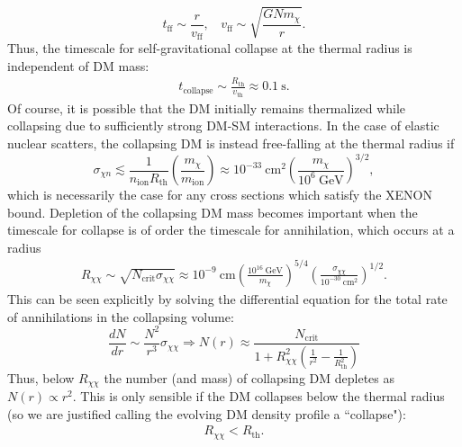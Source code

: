 \documentclass[preprintnumbers,amsmath,amssymb,prd,superscriptaddress]{revtex4}
\newcommand{\GeV}{\text{GeV}}
\newcommand{\cm}{\text{cm}}
\def\r{\right)}
\def\l{\left(}
\begin{document}
\begin{equation}
\label{eq:freefalltime}
t_\text{ff} \sim \frac{r}{v_\text{ff}}, ~~~~ v_\text{ff} \sim \sqrt{\frac{G N m_\chi}{r}}.
\end{equation}
Thus, the timescale for self-gravitational collapse at the thermal radius is independent of DM mass:
\begin{align}
\label{eq:collapsetime}
  t_\text{collapse} \sim \frac{R_\text{th}}{v_\text{th}} \approx 0.1 ~\text{s}.
\end{align}
Of course, it is possible that the DM initially remains thermalized while collapsing due to sufficiently strong DM-SM interactions. 
In the case of elastic nuclear scatters, the collapsing DM is instead free-falling at the thermal radius if
\begin{equation}
\sigma_{\chi n} \lesssim \frac{1}{n_\text{ion} R_\text{th}} \l \frac{m_\chi}{m_\text{ion}}\r \approx 10^{-33} ~\cm^2 \l \frac{m_\chi}{10^6 ~\GeV} \r^{3/2},
\end{equation}
which is necessarily the case for any cross sections which satisfy the XENON bound. 
Depletion of the collapsing DM mass becomes important when the timescale for collapse is of order the timescale for annihilation, which occurs at a radius
\begin{align}
R_{\chi \chi} \sim \sqrt{N_\text{crit} \sigma_{\chi \chi}} \approx 10^{-9} ~\cm  \l \frac{10^{16} ~\GeV}{m_\chi} \r^{5/4} \l \frac{\sigma_{\chi \chi}}{10^{-30} ~\cm^2} \r^{1/2}. 
\end{align}
This can be seen explicitly by solving the differential equation for the total rate of annihilations in the collapsing volume:
\begin{equation}
\label{eq:DMcollapsedeplete}
\frac{dN}{dr} \sim \frac{N^2}{r^3} \sigma_{\chi \chi} \Rightarrow N(r) \approx \frac{N_\text{crit}}{1+ R_{\chi \chi}^2 \l \frac{1}{r^2} -\frac{1}{R_\text{th}^2}\r}
\end{equation}
Thus, below $R_{\chi \chi}$ the number (and mass) of collapsing DM depletes as $N(r) \propto r^2$. 
This is only sensible if the DM collapses below the thermal radius (so we are justified calling the evolving DM density profile a ``collapse"):
\begin{align}
\label{eq:xicondition}
R_{\chi \chi} < R_\text{th}.
\end{align}
\end{document}
